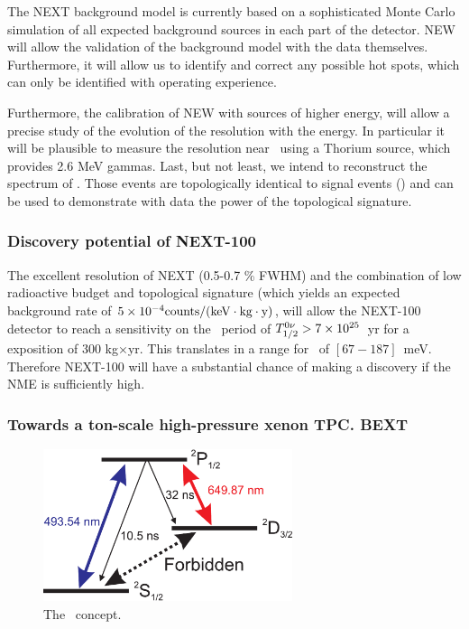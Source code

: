 The NEXT background model is currently based on a sophisticated Monte Carlo simulation of all expected background sources in each part of the detector. NEW will allow the validation of the background model with the data themselves. Furthermore, it will allow us to identify and correct any possible hot spots, which can only be identified with operating experience.

Furthermore, the calibration of NEW with 
sources of higher energy, will allow a precise study of the evolution of the resolution with the energy. 
In particular it will be plausible to measure the resolution near \Qbb\ using a Thorium source, which provides 2.6 MeV gammas. Last, but not least, we intend to 
reconstruct the spectrum of \bbtnu. Those events are topologically identical to signal events (\bbonu) and can be used to demonstrate with data the power of the topological signature. 

\subsubsection*{Discovery potential of NEXT-100}

The excellent resolution of NEXT (0.5-0.7 \% FWHM) and the combination of low radioactive budget and topological signature (which yields an expected background rate of $5 \times 10^{-4} \rm counts/(keV \cdot kg \cdot y)$, will allow the NEXT-100 detector to reach a sensitivity on the \bbonu\ period of $T_{1/2}^{0\nu} > 7 \times 10^{25}$~yr for a exposition of 300 kg$\times$yr. This translates in a range for \mbb\ of $[67-187]$~meV. Therefore NEXT-100 will have a substantial chance of making a discovery if the NME is sufficiently high. 

\subsubsection*{Towards a ton-scale high-pressure xenon TPC. BEXT}

\begin{figure}
\centering
\includegraphics[width=0.65\textwidth]{img/bata.pdf}
\caption{The \BATA\ concept.} \label{fig.BATA}
\end{figure}


